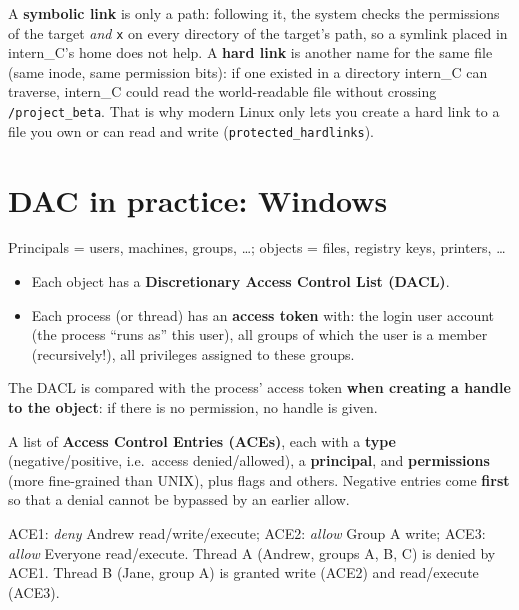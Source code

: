 \begin{rembox}[title={Open question of the slides: what about links? (answer not in the slides)}]
A \textbf{symbolic link} is only a path: following it, the system checks the permissions of the
target \emph{and} \texttt{x} on every directory of the target's path, so a symlink placed in
intern\_C's home does not help. A \textbf{hard link} is another name for the same file (same
inode, same permission bits): if one existed in a directory intern\_C can traverse, intern\_C
could read the world-readable file without crossing \texttt{/project\_beta}. That is why modern
Linux only lets you create a hard link to a file you own or can read and write
(\texttt{protected\_hardlinks}).
\end{rembox}

\section{DAC in practice: Windows}

\begin{defnbox}[title=Windows access control]
Principals = users, machines, groups, \ldots; objects = files, registry keys, printers,
\ldots
\begin{itemize}
  \item Each object has a \textbf{Discretionary Access Control List (DACL)}.
  \item Each process (or thread) has an \textbf{access token} with: the login user
        account (the process ``runs as'' this user), all groups of which the user is a
        member (recursively!), all privileges assigned to these groups.
\end{itemize}
The DACL is compared with the process' access token \textbf{when creating a handle to the
object}: if there is no permission, no handle is given.
\end{defnbox}

\begin{defnbox}[title=DACL]
A list of \textbf{Access Control Entries (ACEs)}, each with a \textbf{type}
(negative/positive, i.e.\ access denied/allowed), a \textbf{principal}, and
\textbf{permissions} (more fine-grained than UNIX), plus flags and others. Negative
entries come \textbf{first} so that a denial cannot be bypassed by an earlier allow.
\end{defnbox}

\begin{exbox}[title=DACL evaluation]
ACE1: \textit{deny} Andrew read/write/execute; ACE2: \textit{allow} Group A write; ACE3:
\textit{allow} Everyone read/execute. Thread A (Andrew, groups A, B, C) is denied by ACE1.
Thread B (Jane, group A) is granted write (ACE2) and read/execute (ACE3).
\end{exbox}

